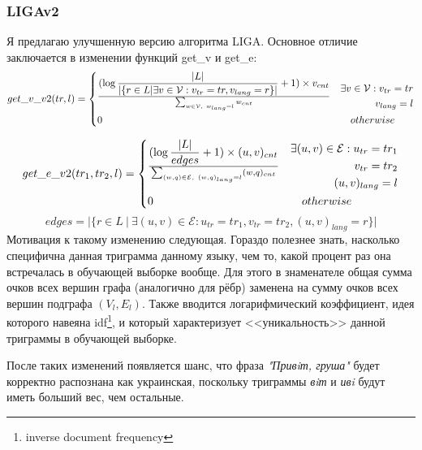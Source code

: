 \documentclass[a4paper, 14pt]{article}
\begin{document}
			\subsubsection{LIGAv2}
			Я предлагаю улучшенную версию алгоритма LIGA. Основное отличие заключается в изменении функций get\_v и get\_e:
			\[
 			get\_v\_v2(tr, l) =
 			  \begin{dcases}
  			   {(\log{|L| \over |\{r \in L | \exists v \in \mathcal{V}: v_{tr}=tr, v_{lang}=r\}|} + 1) \times  v_{cnt}} \over 
  			   \sum_{w \in \mathcal{V},\ w_{lang}=l} w_{cnt} & 
  			   \begin{split} 
						 \exists v \in \mathcal{V}: v_{tr}=tr \\ v_{lang}=l	
  			   	\end{split} \\
  			   0 & \quad otherwise
  			 \end{dcases}
			\]		
		
			\[
 			get\_e\_v2(tr_1, tr_2, l) =
 			  \begin{dcases}
  			   {(\log{|L| \over edges} + 1) \times (u, v)_{cnt}} 
  			   \over \sum_{(w, q) \in \mathcal{E},\ (w, q)_{lang}=l} (w, q)_{cnt} & 
  			    \begin{split} 
						 \exists (u, v) \in \mathcal{E}:  u_{tr}=tr_1 \\ v_{tr}=tr_2 \\ (u, v)_{lang}=l
  			   	\end{split} \\
  			   0 & \quad otherwise
  			 \end{dcases}
			\]	
			$$ edges = |\{r \in L \ | \ \exists (u, v) \in \mathcal{E}: u_{tr}=tr_1, v_{tr}=tr_2, (u, v)_{lang}=r\}| $$
			Мотивация к такому изменению следующая. Гораздо полезнее знать, насколько специфична данная триграмма данному языку, чем то, какой процент
			раз она встречалась в обучающей выборке вообще. Для этого в знаменателе общая сумма очков всех вершин графа (аналогично для рёбр) заменена 
			на сумму очков всех вершин подграфа $(V_{l}, E_{l})$. Также вводится логарифмический коэффициент, идея которого 
			навеяна idf\footnote{inverse document frequency}, и который характеризует <<уникальность>> данной триграммы в обучающей выборке.
			
			После таких изменений появляется шанс, что фраза \textit{"Привiт, груша"} будет корректно распознана как украинская, поскольку триграммы
			\textit{вiт} и \textit{ивi} будут иметь больший вес, чем остальные.
\end{document}
